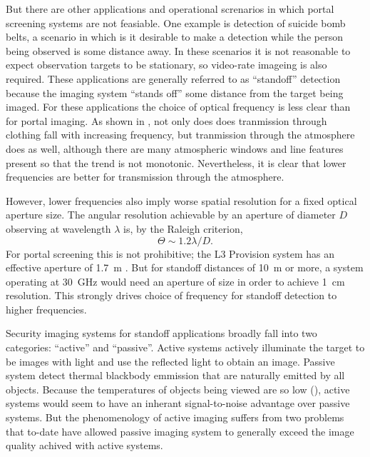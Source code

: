 But there are other applications and operational screnarios in which portal screening systems are not feasiable.
One example is detection of suicide bomb belts, a scenario in which is it desirable to make a detection while the person being observed is some distance away.
In these scenarios it is not reasonable to expect observation targets to be stationary, so video-rate imageing is also required.
These applications are generally referred to as ``standoff'' detection because the imaging system ``stands off'' some distance from the target being imaged.
For these applications the choice of optical frequency is less clear than for portal imaging.
As shown in , not only does does tranmission through clothing fall with increasing frequency, but tranmission through the atmosphere does as well, although there are many atmospheric windows and line features present so that the trend is not monotonic.
Nevertheless, it is clear that lower frequencies are better for transmission through the atmosphere.

However, lower frequencies also imply worse spatial resolution for a fixed optical aperture size.
The angular resolution achievable by an aperture of diameter $D$ observing at wavelength $\lambda$ is, by the Raleigh criterion,
\begin{equation} \label{eqn:ch1-raleigh}
  \Theta \sim 1.2 \lambda / D.
\end{equation}
For portal screening this is not prohibitive; the L3 Provision system has an effective aperture of \SI{1.7}{\m} \cite{mcmakin_dual-surface_2009}.
But for standoff distances of \SI{10}{\m} or more, a system operating at \SI{30}{\GHz} would need an aperture of size  in order to achieve \SI{1}{\cm} resolution.
This strongly drives choice of frequency for standoff detection to higher frequencies.

Security imaging systems for standoff applications broadly fall into two categories: ``active'' and ``passive''.
Active systems actively illuminate the target to be images with light and use the reflected light to obtain an image.
Passive system detect thermal blackbody emmission that are naturally emitted by all objects.
Because the temperatures of objects being viewed are so low (), active systems would seem to have an inherant signal-to-noise advantage over passive systems.
But the phenomenology of active imaging suffers from two problems that to-date have allowed passive imaging system to generally exceed the image quality achived with active systems.

